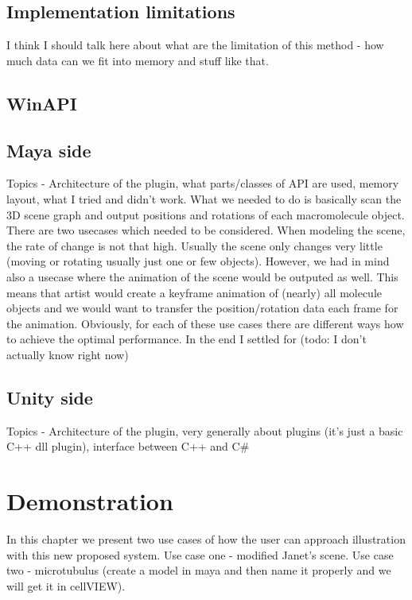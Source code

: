 \documentclass[
  digital, %
  table,   %
  nolof,     %
  nolot,     %
]{fithesis3}
\begin{document}
\section{Implementation limitations}
I think I should talk here about what are the limitation of this method - how much data can we fit into memory and stuff like that.

\section{WinAPI}
\section{Maya side}
Topics - Architecture of the plugin, what parts/classes of API are used, memory layout, what I tried and didn't work.
What we needed to do is basically scan the 3D scene graph and output positions and rotations of each macromolecule object. There are two usecases which needed to be considered. When modeling the scene, the rate of change is not that high. Usually the scene only changes very little (moving or rotating usually just one or few objects). However, we had in mind also a usecase where the animation of the scene would be outputed as well. This means that artist would create a keyframe animation of (nearly) all molecule objects and we would want to transfer the position/rotation data each frame for the animation. Obviously, for each of these use cases there are different ways how to achieve the optimal performance. In the end I settled for (todo: I don't actually know right now)
\section{Unity side}
Topics - Architecture of the plugin, very generally about plugins (it's just a basic C++ dll plugin), interface between C++ and C\#

\chapter{Demonstration}
In this chapter we present two use cases of how the user can approach illustration with this new proposed system.
Use case one - modified Janet's scene.
Use case two - microtubulus (create a model in maya and then name it properly and we will get it in cellVIEW).
\end{document}
